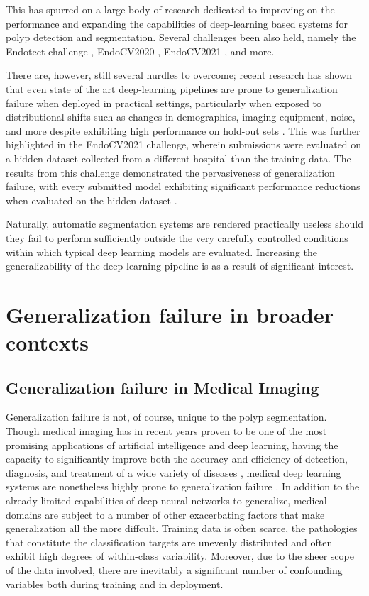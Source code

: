 	This has spurred on a large body of research dedicated to improving on the performance and expanding the capabilities of deep-learning based systems for polyp detection and segmentation. Several challenges been also held, namely the Endotect challenge \cite{endotect}, EndoCV2020 \cite{endocv2020}, EndoCV2021 \cite{endocv2021}, and more.
	
	There are, however, still several hurdles to overcome; recent research has shown that even state of the art deep-learning pipelines are prone to generalization failure when deployed in practical settings, particularly when exposed to distributional shifts such as changes in demographics, imaging equipment, noise, and more despite exhibiting high performance on hold-out sets \cite{retinopathy, damour2020underspecification, pneumonia, shortcut_learning}. This was further highlighted in the EndoCV2021 challenge, wherein submissions were evaluated on a hidden dataset collected from a different hospital than the training data. The results from this challenge demonstrated the pervasiveness of generalization failure, with every submitted model exhibiting significant performance reductions when evaluated on the hidden dataset \cite{endocv2021}. 
	
	Naturally, automatic segmentation systems are rendered practically useless should they fail to perform sufficiently outside the very carefully controlled conditions within which typical deep learning models are evaluated. Increasing the generalizability of the deep learning pipeline is as a result of significant interest. 

\section{Generalization failure in broader contexts} \label{case_studies}
	\subsection{Generalization failure in Medical Imaging}
	Generalization failure is not, of course, unique to the polyp segmentation. Though medical imaging has in recent years proven to be one of the most promising applications of artificial intelligence and deep learning, having the capacity to significantly improve both the accuracy and efficiency of detection, diagnosis, and treatment of a wide variety of diseases \cite{dl_medical_imaging}, medical deep learning systems are nonetheless highly prone to generalization failure \cite{damour2020underspecification, shortcut_learning}. In addition to the already limited capabilities of deep neural networks to generalize, medical domains are subject to a number of other exacerbating factors that make generalization all the more diffcult. Training data is often scarce, the pathologies that constitute the classification targets are unevenly distributed and often exhibit high degrees of within-class variability. Moreover, due to the sheer scope of the data involved, there are inevitably a significant number of confounding variables both during training and in deployment.  
	

